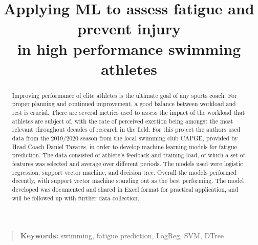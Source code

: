 \documentclass[conference]{IEEEtran}
\begin{document}
\title{Applying ML to assess fatigue and prevent injury\\in high performance swimming athletes}

\author{
\and
{}
}


\maketitle
\thispagestyle{plain}

\begin{abstract}
Improving performance of elite athletes is the ultimate goal of any sports coach. For proper planning and continued improvement, a good balance between workload and rest is crucial. There are several metrics used to assess the impact of the workload that athletes are subject of, with the rate of perceived exertion being amongst the most relevant throughout decades of research in the field. 
For this project the authors used data from the 2019/2020 season from the local swimming club CAPGE, provided by Head Coach Daniel Tavares, in order to develop machine learning models for fatigue prediction. The data consisted of athlete's feedback and training load, of which a set of features was selected and average over different periods. The models used were logistic regression, support vector machine, and decision tree. Overall the models performed decently, with support vector machine standing out as the best performing. 
The model developed was documented and shared in Excel format for practical application, and will be followed up with further data collection.
\end{abstract}

\begin{quote}
\small
\noindent
\textbf{Keywords:} swimming, fatigue prediction, LogReg, SVM, DTree
\end{quote}
\end{document}
